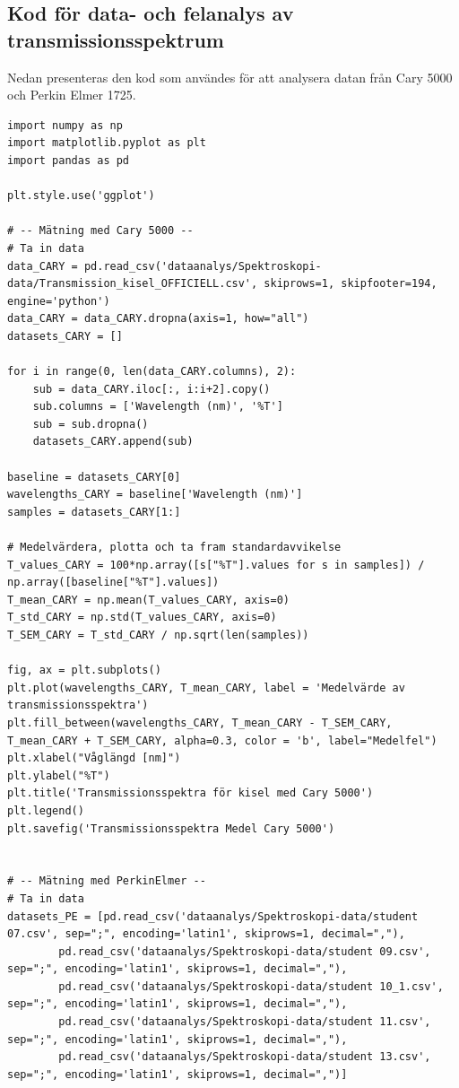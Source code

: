 \documentclass[12pt, a4paper]{article}
\begin{document}
\subsection{Kod för data- och felanalys av transmissionsspektrum}
\label{app:kod-transmission}
Nedan presenteras den kod som användes för att analysera datan från Cary 5000 och Perkin Elmer 1725.
\begin{lstlisting}[style=mypython, label={lst:dataanalys_transmission}]
import numpy as np
import matplotlib.pyplot as plt
import pandas as pd

plt.style.use('ggplot')

# -- Mätning med Cary 5000 --
# Ta in data
data_CARY = pd.read_csv('dataanalys/Spektroskopi-data/Transmission_kisel_OFFICIELL.csv', skiprows=1, skipfooter=194, engine='python')
data_CARY = data_CARY.dropna(axis=1, how="all")
datasets_CARY = []

for i in range(0, len(data_CARY.columns), 2):
    sub = data_CARY.iloc[:, i:i+2].copy()
    sub.columns = ['Wavelength (nm)', '%T']
    sub = sub.dropna()
    datasets_CARY.append(sub)

baseline = datasets_CARY[0]
wavelengths_CARY = baseline['Wavelength (nm)']
samples = datasets_CARY[1:]

# Medelvärdera, plotta och ta fram standardavvikelse
T_values_CARY = 100*np.array([s["%T"].values for s in samples]) / np.array([baseline["%T"].values])
T_mean_CARY = np.mean(T_values_CARY, axis=0)
T_std_CARY = np.std(T_values_CARY, axis=0)
T_SEM_CARY = T_std_CARY / np.sqrt(len(samples))

fig, ax = plt.subplots()
plt.plot(wavelengths_CARY, T_mean_CARY, label = 'Medelvärde av transmissionsspektra')
plt.fill_between(wavelengths_CARY, T_mean_CARY - T_SEM_CARY, T_mean_CARY + T_SEM_CARY, alpha=0.3, color = 'b', label="Medelfel")
plt.xlabel("Våglängd [nm]")
plt.ylabel("%T")
plt.title('Transmissionsspektra för kisel med Cary 5000')
plt.legend()
plt.savefig('Transmissionsspektra Medel Cary 5000')


# -- Mätning med PerkinElmer --
# Ta in data
datasets_PE = [pd.read_csv('dataanalys/Spektroskopi-data/student 07.csv', sep=";", encoding='latin1', skiprows=1, decimal=","),
        pd.read_csv('dataanalys/Spektroskopi-data/student 09.csv', sep=";", encoding='latin1', skiprows=1, decimal=","),
        pd.read_csv('dataanalys/Spektroskopi-data/student 10_1.csv', sep=";", encoding='latin1', skiprows=1, decimal=","),
        pd.read_csv('dataanalys/Spektroskopi-data/student 11.csv', sep=";", encoding='latin1', skiprows=1, decimal=","),
        pd.read_csv('dataanalys/Spektroskopi-data/student 13.csv', sep=";", encoding='latin1', skiprows=1, decimal=",")]



\end{lstlisting}
\end{document}
